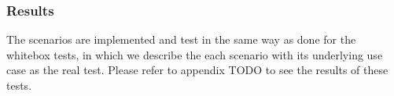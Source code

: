 \subsubsection{Results}
The scenarios are implemented and test in the same way as done for the whitebox tests, in which we describe the each scenario with its underlying use case as the real test. Please refer to appendix TODO to see the results of these tests.

    
